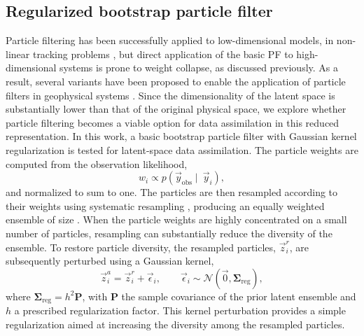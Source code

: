 \subsection{Regularized bootstrap particle filter} 
\label{sec:pf}
Particle filtering \citep{doucet2001} has been successfully applied to low-dimensional models, \eg in non-linear tracking problems \citep{arulampalam2002}, but direct application of the basic PF to high-dimensional systems is prone to weight collapse, as discussed previously. As a result, several variants have been proposed to enable the application of particle filters in geophysical systems \citep{vanleeuwen2009}. Since the dimensionality of the latent space is substantially lower than that of the original physical space, we explore whether particle filtering becomes a viable option for data assimilation in this reduced representation. In this work, a basic bootstrap particle filter \citep{gordon1993} with Gaussian kernel regularization \citep{pham2001} is tested for latent-space data assimilation. The particle weights are computed from the observation likelihood,
\begin{equation}
w_i \propto p\left(\vec{y}_{\mathrm{obs}}\mid\ \vec{y}_i\right),
\end{equation}
and normalized to sum to one. The particles are then resampled according to their weights using systematic resampling \citep{kitagawa1996}, producing an equally weighted ensemble of size \ensSize. When the particle weights are highly concentrated on a small number of particles, resampling can substantially reduce the diversity of the ensemble. To restore particle diversity, the resampled particles, $\vec{z}_i^r$, are subsequently perturbed using a Gaussian kernel,
\begin{equation}
\vec{z}_i^{a}=\vec{z}_i^r+\vec{\epsilon}_i, \qquad
\vec{\epsilon}_i\sim\mathcal{N}(\vec{0},\mathbf{\Sigma}_{\mathrm{reg}}),
\end{equation}
where $\mathbf{\Sigma}_{\mathrm{reg}}=h^2\mathbf{P}$, with $\mathbf{P}$ the sample covariance of the prior latent ensemble and $h$ a prescribed regularization factor. This kernel perturbation provides a simple regularization aimed at increasing the diversity among the resampled particles.